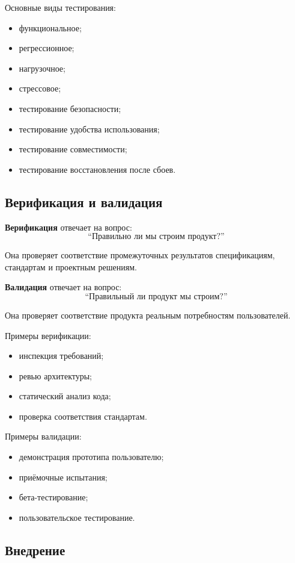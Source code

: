 \documentclass[12pt,a4paper]{article}
\begin{document}
Основные виды тестирования:
\begin{itemize}
    \item функциональное;
    \item регрессионное;
    \item нагрузочное;
    \item стрессовое;
    \item тестирование безопасности;
    \item тестирование удобства использования;
    \item тестирование совместимости;
    \item тестирование восстановления после сбоев.
\end{itemize}

\subsection{Верификация и валидация}

\textbf{Верификация} отвечает на вопрос:
\[
\text{``Правильно ли мы строим продукт?''}
\]

Она проверяет соответствие промежуточных результатов спецификациям, стандартам и проектным решениям.

\textbf{Валидация} отвечает на вопрос:
\[
\text{``Правильный ли продукт мы строим?''}
\]

Она проверяет соответствие продукта реальным потребностям пользователей.

Примеры верификации:
\begin{itemize}
    \item инспекция требований;
    \item ревью архитектуры;
    \item статический анализ кода;
    \item проверка соответствия стандартам.
\end{itemize}

Примеры валидации:
\begin{itemize}
    \item демонстрация прототипа пользователю;
    \item приёмочные испытания;
    \item бета-тестирование;
    \item пользовательское тестирование.
\end{itemize}

\subsection{Внедрение}
\end{document}
